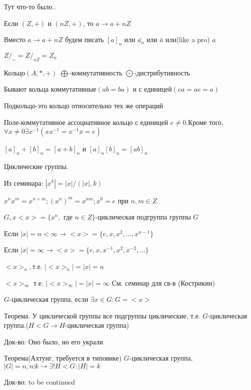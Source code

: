 \documentclass[12pt]{article}
\begin{document}
Тут что-то было..

Если $(Z,+)$ и $(nZ,+)$, то $a\rightarrow a+nZ$

Вместо $a\rightarrow a+nZ$ будем писать $[a]_n$ или $ \bar{a_n}$ или $\bar{a}$ или(like a pro) $a$

$Z/_{\sim}=Z/_{nZ}=Z_n$

Кольцо$(A,*,+)$
$\bigoplus$-коммутативность
$\bigodot$-дистрибутивность

Бывают кольца коммутативные$(ab=ba)$ и с единицей$(ea=ae=a)$

Подкольцо-это кольцо относительно тех же операций

Поле-коммутативное ассоциативное кольцо с единицей $e\not= 0$.Кроме того, $\forall x\not=0 \exists x^{-1} (xx^{-1}=x^{-1}x=e)$

$[a]_n+[b]_n=[a+b]_n$ и $[a]_n [b]_n=[ab]_n$

Циклические группы.

Из семинара: $|x^k|=|x|/(|x|,k)$

$x^n x^m=x^{n+m}; (x^n)^m=x^{nm}; x^0=e$ при $n,m \in Z$

$G,x <x>=\{x^n,$ где $n\in Z\}$-циклическая подгруппа группы $G$

Если $|x|=n<\infty \rightarrow <x>= \{e,x,x^2, \dots, x^{n-1} \}$

Если $|x|=\infty \rightarrow <x>=\{e,x,x^{-1},x^2, x^{-2}, \dots \}$ 

$<x>_n, $т.е. $|<x>_n|=|x|=n$

$<x>_\infty$ т.е. $|<x>_\infty|=|x|=\infty$ См. семинар для св-в (Кострикин)

$G$-циклическая группа, если $\exists x\in G:G=<x>$

Теорема. У циклической группы все подгруппы циклические, т.е. $G$-циклическая группа.($H<G \rightarrow H$-циклическая группа)

Док-во: Оно было, но его украли

Теорема(Ахтунг, требуется в типовике) $G$-циклическая группа, $|G|=n, n\vdots k \rightarrow \exists ! H<G:|H|=k$

Док-во: to be continued
\end{document}
